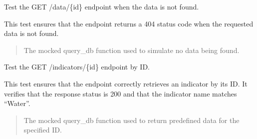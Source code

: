 \documentclass[letterpaper,10pt,english]{sphinxmanual}
\begin{document}

\begin{fulllineitems}
\label{\detokenize{test.my_fastapi:test.my_fastapi.test_main.test_get_data_by_id_not_found}}
\pysigstartsignatures
\pysiglinewithargsret
{}
{}
{}
\pysigstopsignatures
\sphinxAtStartPar
Test the GET /data/\{id\} endpoint when the data is not found.

\sphinxAtStartPar
This test ensures that the endpoint returns a 404 status code when the requested data is not found.
\begin{quote}\begin{description}
\sphinxAtStartPar
{} \textendash{} The mocked query\_db function used to simulate no data being found.

\end{description}\end{quote}

\end{fulllineitems}


\begin{fulllineitems}
\label{\detokenize{test.my_fastapi:test.my_fastapi.test_main.test_get_indicator_by_id}}
\pysigstartsignatures
\pysiglinewithargsret
{}
{}
{}
\pysigstopsignatures
\sphinxAtStartPar
Test the GET /indicators/\{id\} endpoint by ID.

\sphinxAtStartPar
This test ensures that the endpoint correctly retrieves an indicator by its ID.
It verifies that the response status is 200 and that the indicator name matches “Water”.
\begin{quote}\begin{description}
\sphinxAtStartPar
{} \textendash{} The mocked query\_db function used to return predefined data for the specified ID.

\end{description}\end{quote}

\end{fulllineitems}
\end{document}
